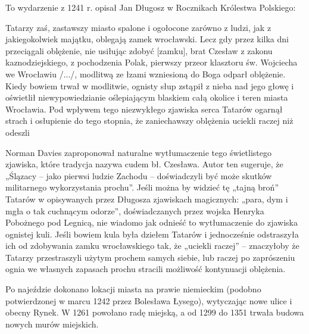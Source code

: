 \documentclass{article}
\begin{document}
To wydarzenie z 1241 r. opisał Jan Długosz w Rocznikach Królestwa Polskiego:

\begin{displayquote}

Tatarzy zaś, zastawszy miasto spalone i ogołocone zarówno z ludzi, jak z jakiegokolwiek majątku, oblegają zamek wrocławski. Lecz gdy przez kilka dni przeciągali oblężenie, nie usiłując zdobyć [zamku], brat Czesław z zakonu kaznodziejskiego, z pochodzenia Polak, pierwszy przeor klasztoru św. Wojciecha we Wrocławiu /.../, modlitwą ze łzami wzniesioną do Boga odparł oblężenie. Kiedy bowiem trwał w modlitwie, ognisty słup zstąpił z nieba nad jego głowę i oświetlił niewypowiedzianie oślepiającym blaskiem całą okolice i teren miasta Wrocławia. Pod wpływem tego niezwykłego zjawiska serca Tatarów ogarnął strach i osłupienie do tego stopnia, że zaniechawszy oblężenia uciekli raczej niż odeszli

\end{displayquote}

Norman Davies zaproponował naturalne wytłumaczenie tego świetlistego zjawiska, które tradycja nazywa cudem bł. Czesława. Autor ten sugeruje, że „Ślązacy – jako pierwsi ludzie Zachodu – doświadczyli być może skutków militarnego wykorzystania prochu”. Jeśli można by widzieć tę „tajną broń” Tatarów w opisywanych przez Długosza zjawiskach magicznych: „para, dym i mgła o tak cuchnącym odorze”, doświadczanych przez wojska Henryka Pobożnego pod Legnicą, nie wiadomo jak odnieść to wytłumaczenie do zjawiska ognistej kuli. Jeśli bowiem kula była dziełem Tatarów i jednocześnie odstraszyła ich od zdobywania zamku wrocławskiego tak, że „uciekli raczej” – znaczyłoby że Tatarzy przestraszyli użytym prochem samych siebie, lub raczej po zaprószeniu ognia we własnych zapasach prochu stracili możliwość kontynuacji oblężenia.

Po najeździe dokonano lokacji miasta na prawie niemieckim (podobno potwierdzonej w marcu 1242 przez Bolesława Łysego), wytyczając nowe ulice i obecny Rynek. W 1261 powołano radę miejską, a od 1299 do 1351 trwała budowa nowych murów miejskich.
\end{document}
